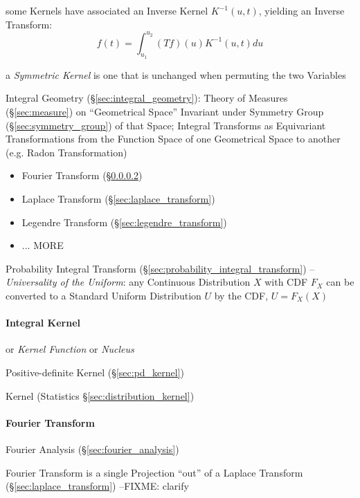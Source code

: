 {some Kernels have associated an Inverse Kernel $K^{-1}(u,t)$, yielding an
Inverse Transform:
\[
  f(t) = \int_{u_1}^{u_2} (T f)(u) K^{-1}(u,t) du
\]

a \emph{Symmetric Kernel} is one that is unchanged when permuting the two
Variables

\fist Integral Geometry (\S\ref{sec:integral_geometry}): Theory of Measures
(\S\ref{sec:measure}) on ``Geometrical Space'' Invariant under Symmetry Group
(\S\ref{sec:symmetry_group}) of that Space; Integral Transforms as Equivariant
Transformations from the Function Space of one Geometrical Space to another
(e.g. Radon Transformation)

\begin{itemize}
  \item Fourier Transform (\S\ref{sec:fourier_transform})
  \item Laplace Transform (\S\ref{sec:laplace_transform})
  \item Legendre Transform (\S\ref{sec:legendre_transform})
  \item ... MORE
\end{itemize}

\fist Probability Integral Transform
(\S\ref{sec:probability_integral_transform}) -- \emph{Universality of the
Uniform}: any Continuous Distribution $X$ with CDF $F_X$ can be converted to a
Standard Uniform Distribution $U$ by the CDF, $U = F_X(X)$



\paragraph{Integral Kernel}\label{sec:integral_kernel}\hfill

or \emph{Kernel Function} or \emph{Nucleus}

\fist Positive-definite Kernel (\S\ref{sec:pd_kernel})

\fist Kernel (Statistics \S\ref{sec:distribution_kernel})



\paragraph{Fourier Transform}\label{sec:fourier_transform}\hfill

\fist Fourier Analysis (\S\ref{sec:fourier_analysis})

Fourier Transform is a single Projection ``out'' of a Laplace Transform
(\S\ref{sec:laplace_transform}) --FIXME: clarify

}
